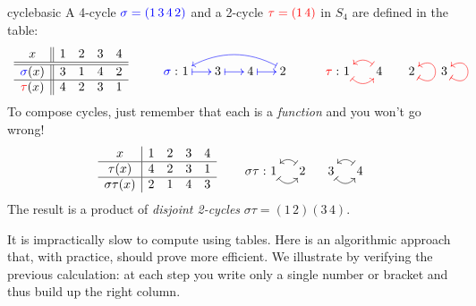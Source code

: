 \begin{example}{}{cyclebasic}
A 4-cycle $\textcolor{blue}{\sigma=(1\,3\,4\,2)}$ and a 2-cycle $\textcolor{red}{\tau=(1\,4)}$ in $S_4$ are defined in the table:
\[
\begin{array}[t]{c||cccc}
x&1&2&3&4\\\hline\hline
\textcolor{blue}{\sigma}(x)&3&1&4&2\\\hline
\textcolor{red}{\tau}(x)&4&2&3&1
\end{array}
\qquad\qquad
\SelectTips{cm}{}\xymatrix @C15pt @R5pt{
	&&&\\
 	\makebox[0pt][r]{$\textcolor{blue}{\sigma}:\ $}1 \ar@{|->}@[blue][r] & 3 \ar@{|->}@[blue][r] & 4 \ar@{|->}@[blue][r] & 2 \ar@/_1.0pc/@<-2pt>@{|->}@[blue][lll]
 }
\qquad\qquad
\SelectTips{cm}{}\xymatrix @C15pt @R5pt{
	&&&\\
 	\makebox[0pt][r]{$\textcolor{red}{\tau}:$\ }1 \ar@/_0.8pc/@{|->}@[red][r]& 4 \ar@/_0.8pc/@{|->}@[red][l] & 2 \ar@{|->}@(dr,ur)@[red] & 3 \ar@{|->}@(dr,ur)@[red]
}
\]
To compose cycles, just remember that each is a \emph{function} and you won't go wrong!
\[\begin{array}[t]{c|cccc}
x&1&2&3&4\\\hline
\tau(x)&4&2&3&1\\\hline
\sigma\tau(x)&2&1&4&3
\end{array}
\qquad\qquad
\SelectTips{cm}{}\xymatrix @C12pt @R5pt{
	&&&\\
 	\makebox[0pt][r]{$\sigma\tau:$\ }1 \ar@/_0.8pc/@{|->}[r] & 2 \ar@/_0.8pc/@{|->}[l] & 3 \ar@/_0.8pc/@{|->}[r] & 4 \ar@/_0.8pc/@{|->}[l]
}\]
The result is a product of \emph{disjoint 2-cycles} $\sigma\tau=(1\,2)(3\,4)$.
\end{example}


It is impractically slow to compute using tables. Here is an algorithmic approach that, with practice, should prove more efficient. We illustrate by verifying the previous calculation: at each step you write only a single number or bracket and thus build up the right column.

